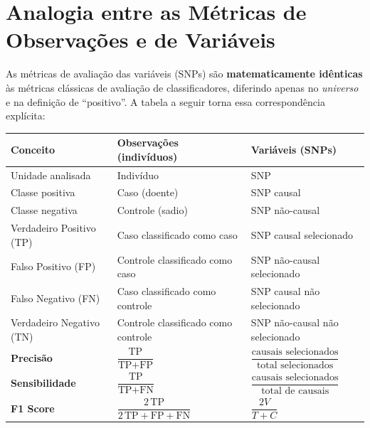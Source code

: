 \documentclass[
    12pt,
    a4paper,
    oneside,
    english,
    french,
    spanish,
    brazil
    ]{abntex2}
\renewcommand{\arraystretch}{1.3}
\newcommand{\novo}[1]{\textcolor{corNova}{#1}}
\begin{document}
\section*{Analogia entre as Métricas de Observações e de Variáveis}

\novo{As métricas de avaliação das variáveis (SNPs) \cite{saeys2007review,guyon2003introduction} são \textbf{matematicamente idênticas} às métricas clássicas de avaliação de classificadores, diferindo apenas no \emph{universo} e na definição de ``positivo''. A tabela a seguir torna essa correspondência explícita:}

\begin{center}
\footnotesize
\setlength{\tabcolsep}{4pt}
\renewcommand{\arraystretch}{1.5}
\begin{tabular}{L{3.2cm}|L{4.8cm}|L{4.8cm}}
  \textbf{Conceito} & \textbf{Observações (indivíduos)} & \textbf{Variáveis (SNPs)} \\
  \hline
  Unidade analisada & Indivíduo & SNP \\
  \hline
  Classe positiva & Caso (doente) & SNP causal \\
  \hline
  Classe negativa & Controle (sadio) & SNP não-causal \\
  \hline
  Verdadeiro Positivo (TP) & Caso classificado como caso & SNP causal selecionado \\
  \hline
  Falso Positivo (FP) & Controle classificado como caso & SNP não-causal selecionado \\
  \hline
  Falso Negativo (FN) & Caso classificado como controle & SNP causal não selecionado \\
  \hline
  Verdadeiro Negativo (TN) & Controle classificado como controle & SNP não-causal não selecionado \\
  \hline
  \textbf{Precisão} & $\dfrac{\text{TP}}{\text{TP}+\text{FP}}$ & $\dfrac{\text{causais selecionados}}{\text{total selecionados}}$ \\[6pt]
  \hline
  \textbf{Sensibilidade} & $\dfrac{\text{TP}}{\text{TP}+\text{FN}}$ & $\dfrac{\text{causais selecionados}}{\text{total de causais}}$ \\[6pt]
  \hline
  \textbf{F1 Score} & $\dfrac{2\,\text{TP}}{2\,\text{TP}+\text{FP}+\text{FN}}$ & $\dfrac{2V}{T + C}$  \\[6pt]
\end{tabular}
\end{center}
\renewcommand{\arraystretch}{1.3}
\end{document}
